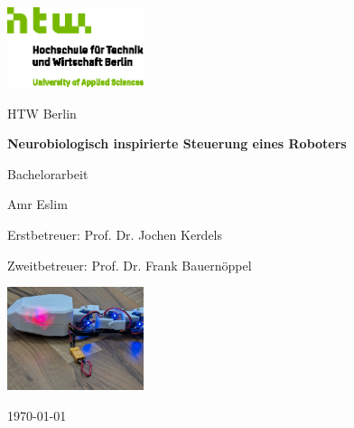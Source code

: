 \documentclass[12pt,a4paper]{report}
\begin{document}
\begin{titlepage}
    \centering
    \vspace*{1cm}
    \includegraphics[width=0.3\textwidth]{media/Logo_HTW_Berlin.eps}\par\vspace{1cm}
    
    {\Large HTW Berlin\par}\vspace{0.5cm}
    
    {\Huge\bfseries Neurobiologisch inspirierte Steuerung eines Roboters\par}\vspace{0.5cm}
    
    {\Large Bachelorarbeit\par}\vspace{0.5cm}
    {\Large Amr Eslim\par}\vspace{0.5cm}
    
    {\Large Erstbetreuer: Prof. Dr. Jochen Kerdels\par}\vspace{0.3cm}
    {\Large Zweitbetreuer: Prof. Dr. Frank Bauernöppel\par}\vspace{0.8cm}
    
    \includegraphics[width=0.3\textwidth]{media/snake_robot.jpg}\par\vspace{0.5cm}
    
    {\Large \today\par}
\end{titlepage}
\end{document}
